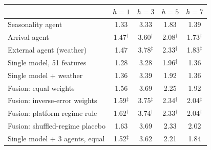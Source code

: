 \begin{tabular}{lcccc}
\toprule
 & $h{=}1$ & $h{=}3$ & $h{=}5$ & $h{=}7$\\
\midrule
Seasonality agent & 1.33 & 3.33 & 1.83 & 1.39\\
Arrival agent & 1.47$^{\ddagger}$ & 3.60$^{\ddagger}$ & 2.08$^{\ddagger}$ & 1.73$^{\ddagger}$\\
External agent (weather) & 1.47 & 3.78$^{\ddagger}$ & 2.33$^{\ddagger}$ & 1.83$^{\ddagger}$\\
Single model, 51 features & 1.28 & 3.28 & 1.96$^{\ddagger}$ & 1.36\\
Single model + weather & 1.36 & 3.39 & 1.92 & 1.36\\
Fusion: equal weights & 1.56 & 3.69 & 2.25 & 1.92\\
Fusion: inverse-error weights & 1.59$^{\ddagger}$ & 3.75$^{\ddagger}$ & 2.34$^{\ddagger}$ & 2.04$^{\ddagger}$\\
Fusion: platform regime rule & 1.62$^{\ddagger}$ & 3.74$^{\ddagger}$ & 2.33$^{\ddagger}$ & 2.04$^{\ddagger}$\\
Fusion: shuffled-regime placebo & 1.63 & 3.69 & 2.33 & 2.02\\
Single model + 3 agents, equal & 1.52$^{\ddagger}$ & 3.62 & 2.21 & 1.84\\
\bottomrule
\end{tabular}
